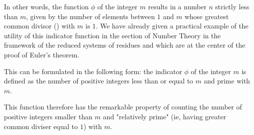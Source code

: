 	In other words, the function $\phi$ of the integer $m$ results in a number $n$ strictly less than $m$, given by the number of elements between $1$ and $m$ whose greatest common divisor () with $m$ is $1$. We have already given a practical example of the utility of this indicator function in the section of Number Theory in the framework of the reduced systems of residues and which are at the center of the proof of Euler's theorem.
	
	This can be formulated in the following form: the indicator $\phi$ of the integer $m$ is defined as the number of positive integers less than or equal to $m$ and prime with $m$.

	This function therefore has the remarkable property of counting the number of positive integers smaller than $m$ and "relatively prime" (ie, having greater common diviser equal to $1$) with $m$.


